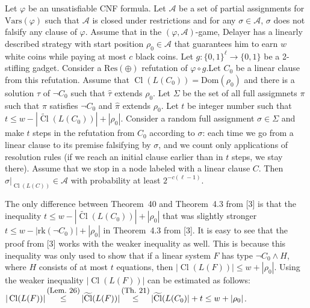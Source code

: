 \documentclass[10pt,a4paper]{article}
\begin{document}
Let $\varphi$ be an unsatisfiable CNF formula. Let $\mathcal{A}$ be a set of partial assignments for $\mathrm{Vars}(\varphi)$ such that $\mathcal{A}$ is closed under restrictions and for any $\sigma\in\mathcal{A}$, $\sigma$ does not falsify any clause of $\varphi$.
Assume that in the $(\varphi,\mathcal{A})$-game, Delayer has a linearly described strategy with start position $\rho_{0}\in\mathcal{A}$ that guarantees him to earn $w$ white coins while paying at most $c$ black coins. Let $g\colon\{0,1\}^{\ell}\to\{0,1\}$ be a 2-stifling gadget.
Consider a $\mathrm{Res}(\oplus)$ refutation of $\varphi\circ g$.Let $C_{0}$ be a linear clause from this refutation. Assume that $\mathop{\mathrm{Cl}}(L(C_{0}))=\mathrm{Dom}(\rho_{0})$ and there is a solution $\tau$ of $\lnot C_{0}$ such that $\hat{\tau}$ extends $\rho_{0}$.
Let $\Sigma$ be the set of all full assigmnets $\pi$ such that $\pi$ satisfies $\lnot C_{0}$ and $\hat{\pi}$ extends $\rho_{0}$. Let $t$ be integer number such that $t\leq w-|\widetilde{\mathop{\mathrm{Cl}}}(L(C_{0}))|+|\rho_{0}|$. Consider a random full assignment $\sigma\in\Sigma$
and make $t$ steps in the refutation from $C_{0}$ according to $\sigma$: each time we go from a linear clause to its premise falsifying by $\sigma$, and we count only applications of resolution rules (if we reach an initial clause earlier than in $t$ steps, we stay there). Assume that we stop in a node labeled with a linear clause $C$. Then $\hat{\sigma}|_{\mathop{\mathrm{Cl}}(L(C))}\in\mathcal{A}$ with probability at least
$2^{-c(\ell-1)}$.\par




The only difference between Theorem 40 and Theorem 4.3 from [3] is that the inequality $t\leq w-|\widetilde{\mathop{\mathrm{Cl}}}(L(C_{0}))|+|\rho_{0}|$ that was slightly stronger $t\leq w-|\mathrm{rk}(\lnot C_{0})|+|\rho_{0}|$ in Theorem 4.3 from [3]. It is easy to see that the proof from [3] works with the weaker inequality as well. This is because this inequality was only used to show that if a linear system $F$ has type $\lnot C_{0}\land H$, where $H$ consists of at most $t$ equations, then $|\mathop{\mathrm{Cl}}(L(F))|\leq w+|\rho_{0}|$. Using the weaker inequality $|\mathop{\mathrm{Cl}}(L(F))|$ can be estimated as follows:
$|\mathop{\mathrm{Cl}}(L(F))|\mathop{\leq}\limits^{\mbox{\small(Lem.\leavevmode\nobreak\ 26)}}|\widetilde{\mathop{\mathrm{Cl}}}(L(F))|\mathop{\leq}\limits^{\mbox{\small(Th.\leavevmode\nobreak\ 21)}}|\widetilde{\mathop{\mathrm{Cl}}}(L(C_{0})|+t\leq w+|\rho_{0}|$.\par
\end{document}
